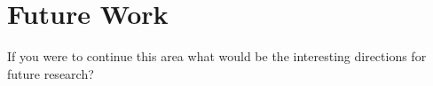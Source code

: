 \section{Future Work}
If you were to continue this area what would be the interesting directions for future research?